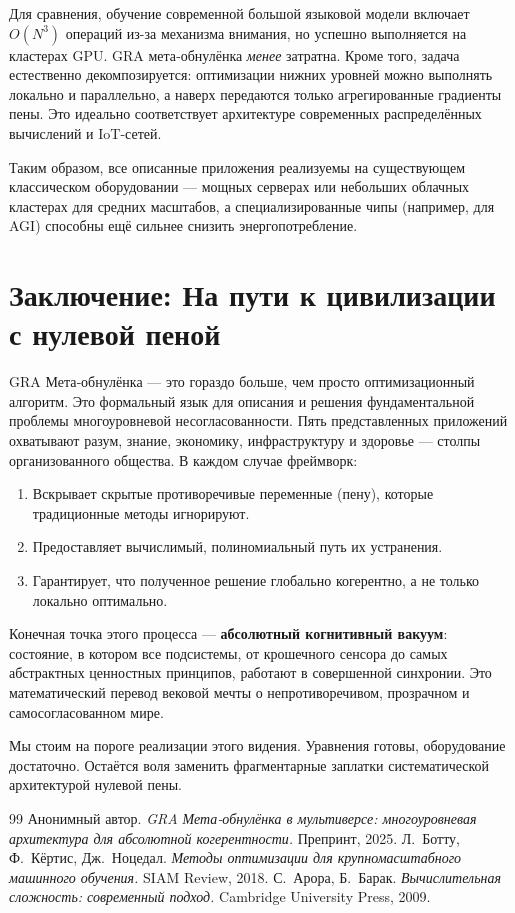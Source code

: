 \documentclass[11pt,a4paper]{article}
\theoremstyle{definition}
\begin{document}
Для сравнения, обучение современной большой языковой модели включает $O(N^3)$ операций из-за механизма внимания, но успешно выполняется на кластерах GPU. GRA мета‑обнулёнка \emph{менее} затратна. Кроме того, задача естественно декомпозируется: оптимизации нижних уровней можно выполнять локально и параллельно, а наверх передаются только агрегированные градиенты пены. Это идеально соответствует архитектуре современных распределённых вычислений и IoT-сетей.

Таким образом, все описанные приложения реализуемы на существующем классическом оборудовании — мощных серверах или небольших облачных кластерах для средних масштабов, а специализированные чипы (например, для AGI) способны ещё сильнее снизить энергопотребление.

\section{Заключение: На пути к цивилизации с нулевой пеной}

GRA Мета‑обнулёнка — это гораздо больше, чем просто оптимизационный алгоритм. Это формальный язык для описания и решения фундаментальной проблемы многоуровневой несогласованности. Пять представленных приложений охватывают разум, знание, экономику, инфраструктуру и здоровье — столпы организованного общества.
В каждом случае фреймворк:
\begin{enumerate}
    \item Вскрывает скрытые противоречивые переменные (пену), которые традиционные методы игнорируют.
    \item Предоставляет вычислимый, полиномиальный путь их устранения.
    \item Гарантирует, что полученное решение глобально когерентно, а не только локально оптимально.
\end{enumerate}

Конечная точка этого процесса — \textbf{абсолютный когнитивный вакуум}: состояние, в котором все подсистемы, от крошечного сенсора до самых абстрактных ценностных принципов, работают в совершенной синхронии. Это математический перевод вековой мечты о непротиворечивом, прозрачном и самосогласованном мире.

Мы стоим на пороге реализации этого видения. Уравнения готовы, оборудование достаточно. Остаётся воля заменить фрагментарные заплатки систематической архитектурой нулевой пены.

\begin{thebibliography}{99}
Анонимный автор. \textit{GRA Мета‑обнулёнка в мультиверсе: многоуровневая архитектура для абсолютной когерентности.} Препринт, 2025.
Л.~Ботту, Ф.~Кёртис, Дж.~Ноцедал. \textit{Методы оптимизации для крупномасштабного машинного обучения.} SIAM Review, 2018.
С.~Арора, Б.~Барак. \textit{Вычислительная сложность: современный подход.} Cambridge University Press, 2009.
\end{thebibliography}
\end{document}
